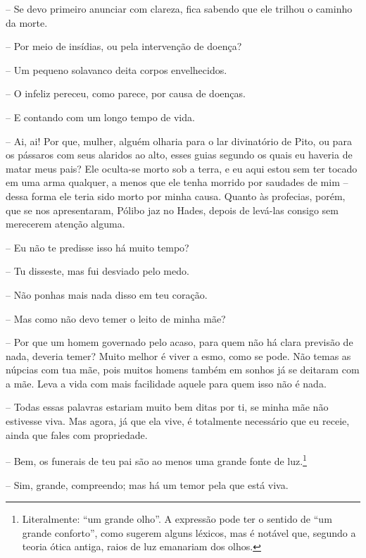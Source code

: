  --   Se devo primeiro anunciar com clareza, fica sabendo que ele trilhou o
caminho da morte.

 --    Por meio de insídias, ou pela intervenção de doença?

 --   Um pequeno solavanco deita corpos envelhecidos.

 --   O infeliz pereceu, como parece, por causa de doenças.

 --   E contando com um longo tempo de vida.

 --   Ai, ai! Por que, mulher, alguém olharia para o lar divinatório de Pito,
ou para os pássaros com seus alaridos ao alto, esses guias segundo os
quais eu haveria de matar meus pais? Ele oculta-se morto sob a terra, e
eu aqui estou sem ter tocado em uma arma qualquer, a menos que ele tenha
morrido por saudades de mim -- dessa forma ele teria  sido morto por
minha causa. Quanto às profecias, porém, que se nos apresentaram, Pólibo
jaz no Hades, depois de levá-las consigo sem merecerem atenção alguma.

 --   Eu não te predisse isso há muito tempo?

 --   Tu disseste, mas fui desviado pelo medo.

 --   Não ponhas mais nada disso em teu coração.

 --   Mas como não devo temer o leito de minha mãe?

 --   Por que um homem governado pelo acaso, para quem não há clara previsão
de nada, deveria temer? Muito melhor é viver a esmo, como se pode. Não
temas as núpcias  com tua mãe, pois muitos homens também em sonhos
já se deitaram com a mãe. Leva a vida com mais facilidade aquele para
quem isso não é nada.

 --   Todas essas palavras estariam muito bem ditas por ti, se minha mãe não
estivesse viva. Mas agora, já que ela vive, é totalmente necessário que
eu receie, ainda que fales com propriedade.

 --   Bem, os funerais de teu pai são ao menos uma grande fonte de
luz.\footnote{Literalmente: ``um grande olho''. A expressão pode ter o
  sentido de ``um grande conforto'', como sugerem alguns léxicos, mas é
  notável que, segundo a teoria ótica antiga, raios de luz emanariam dos
  olhos.}

 --   Sim, grande, compreendo; mas há um temor pela que está viva.

